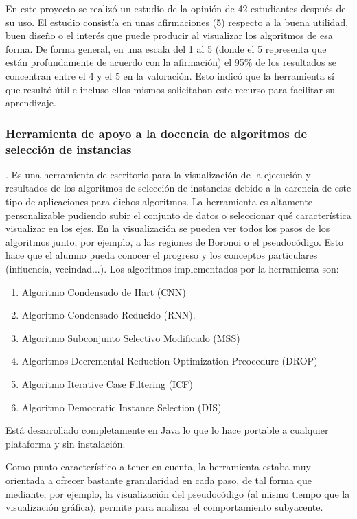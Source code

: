 En este proyecto se realizó un estudio de la opinión de 42 estudiantes después
de su uso. El estudio consistía en unas afirmaciones (5) respecto a la buena
utilidad, buen diseño o el interés que puede producir al visualizar los
algoritmos de esa forma. De forma general, en una escala del 1 al 5 (donde el 5
representa que están profundamente de acuerdo con la afirmación) el 95\% de los
resultados se concentran entre el 4 y el 5 en la valoración. Esto indicó que la
herramienta sí que resultó útil e incluso ellos mismos solicitaban este recurso
para facilitar su aprendizaje.

\subsubsection{Herramienta de apoyo a la docencia de algoritmos de selección de instancias}
\cite{arnaiz2012herramienta}. Es una herramienta de escritorio para la
visualización de la ejecución y resultados de los algoritmos de selección de
instancias debido a la carencia de este tipo de aplicaciones para dichos
algoritmos. La herramienta es altamente personalizable pudiendo subir el
conjunto de datos o seleccionar qué característica visualizar en los ejes. En la
visualización se pueden ver todos los pasos de los algoritmos junto, por
ejemplo, a las regiones de Boronoi o el pseudocódigo. Esto hace que el alumno
pueda conocer el progreso y los conceptos particulares (influencia, vecindad...). Los
algoritmos implementados por la herramienta son:
\begin{enumerate}
    \item Algoritmo Condensado de Hart (CNN)
    \item Algoritmo Condensado Reducido (RNN).
    \item Algoritmo Subconjunto Selectivo Modificado (MSS)
    \item Algoritmos Decremental Reduction Optimization Preocedure (DROP)
    \item Algoritmo Iterative Case Filtering (ICF)
    \item Algoritmo Democratic Instance Selection (DIS)
\end{enumerate}
Está desarrollado completamente en Java lo que lo hace portable a cualquier
plataforma y sin instalación.

Como punto característico a tener en cuenta, la herramienta estaba muy orientada
a ofrecer bastante granularidad en cada paso, de tal forma que mediante, por
ejemplo, la visualización del pseudocódigo (al mismo tiempo que la visualización
gráfica), permite para analizar el comportamiento subyacente.

